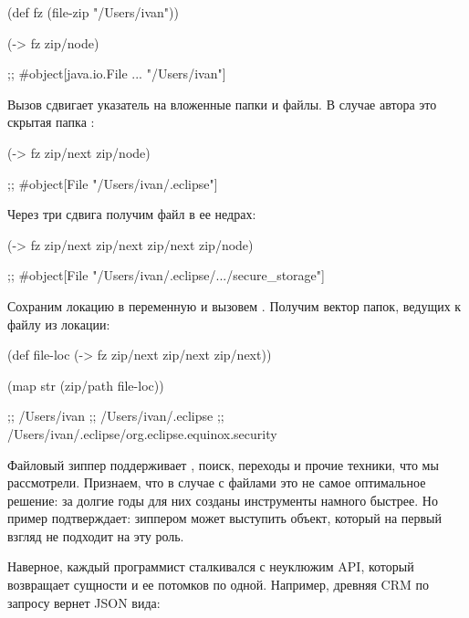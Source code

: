 \begin{english}
  \begin{clojure}
(def fz
  (file-zip "/Users/ivan"))

(-> fz zip/node)

;; #object[java.io.File ... "/Users/ivan"]
  \end{clojure}
\end{english}

Вызов  сдвигает указатель на вложенные папки и файлы. В случае автора
это скрытая папка :

\begin{english}
  \begin{clojure}
(-> fz zip/next zip/node)

;; #object[File "/Users/ivan/.eclipse"]
  \end{clojure}
\end{english}

Через три сдвига получим файл  в ее недрах:

\begin{english}
  \begin{clojure}
(-> fz zip/next zip/next zip/next zip/node)

;; #object[File "/Users/ivan/.eclipse/.../secure_storage"]
  \end{clojure}
\end{english}

Сохраним локацию в переменную и вызовем . Получим вектор папок,
ведущих к файлу из локации:

\begin{english}
  \begin{clojure}
(def file-loc
  (-> fz zip/next zip/next zip/next))

(map str (zip/path file-loc))

;; /Users/ivan
;; /Users/ivan/.eclipse
;; /Users/ivan/.eclipse/org.eclipse.equinox.security
  \end{clojure}
\end{english}

Файловый зиппер поддерживает , поиск, переходы и прочие техники,
что мы рассмотрели. Признаем, что в случае с файлами это не самое оптимальное
решение: за долгие годы для них созданы инструменты намного быстрее. Но пример
подтверждает: зиппером может выступить объект, который на первый взгляд не
подходит на эту роль.


Наверное, каждый программист сталкивался с неуклюжим API, который возвращает
сущности и ее потомков по одной. Например, древняя CRM по запросу  вернет JSON вида:

